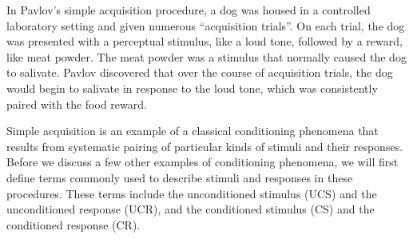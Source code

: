 \documentclass[
  oneside,
  12pt]{crumpbook}
\begin{document}
In Pavlov's simple acquisition procedure, a dog was housed in a controlled laboratory setting and given numerous ``acquisition trials''. On each trial, the dog was presented with a perceptual stimulus, like a loud tone, followed by a reward, like meat powder. The meat powder was a stimulus that normally caused the dog to salivate. Pavlov discovered that over the course of acquisition trials, the dog would begin to salivate in response to the loud tone, which was consistently paired with the food reward.

Simple acquisition is an example of a classical conditioning phenomena that results from systematic pairing of particular kinds of stimuli and their responses. Before we discuss a few other examples of conditioning phenomena, we will first define terms commonly used to describe stimuli and responses in these procedures. These terms include the unconditioned stimulus (UCS) and the unconditioned response (UCR), and the conditioned stimulus (CS) and the conditioned response (CR).
\end{document}
